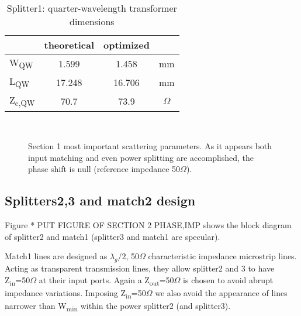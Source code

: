 \begin{table} [h]
	\label{tab:p1_sec1DimQW}
	\caption{Splitter1: quarter-wavelength transformer dimensions}
	\centering	
	\begin{tabular}{lccc} 
		\toprule
		& theoretical & optimized&\\
		\midrule 
		W\textsubscript{QW} 	&	1.599		&	1.458	& mm		\\
		L\textsubscript{QW}	&	17.248		& 	16.706		& mm	\\ 
		Z\textsubscript{c,QW}& 	70.7 &73.9	&$\Omega$ \\
		\bottomrule
	\end{tabular}	
\end{table}

\begin{figure}[h] 
	\centering
	\quad
	\\
	\caption{Section 1 most important scattering parameters. As it appears both input matching and even power splitting are accomplished, the phase shift is null (reference impedance 50$\Omega$).}
	\label{fig:p1_sec1Scatt}
\end{figure}

\newpage

\subsection{Splitters2,3 and match2 design}

Figure * PUT FIGURE OF SECTION 2 PHASE,IMP shows the block diagram of splitter2 and match1 (splitter3  and match1 are specular).

Match1 lines are designed as $\lambda_{g}/2$, 50$\Omega$ characteristic impedance microstrip lines. Acting as transparent transmission lines, they allow splitter2 and 3 to have Z\textsubscript{in}=50$\Omega$ at their input ports. Again a Z\textsubscript{out}=50$\Omega$ is chosen to avoid abrupt impedance variations. Imposing Z\textsubscript{in}=50$\Omega$ we also avoid the appearance of lines narrower than W\textsubscript{min} within the power splitter2 (and splitter3).

